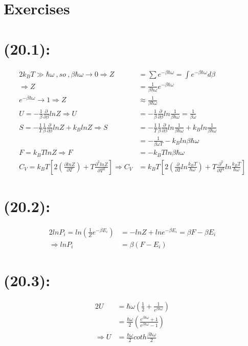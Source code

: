 \begin{latin}
    \section*{Exercises}
    \section*{(20.1):}
    \begin{alignat*}{2}
        k_B T \gg \hbar \omega \ ,so\ ,\beta \hbar \omega\to 0\Longrightarrow Z &= \sum e^{-\beta \hbar \omega} = \int e^{-\beta \hbar \omega} d\beta\\
        \Longrightarrow Z &= \frac{1}{\beta \hbar \omega} e^{-\beta \hbar \omega} \\
        e^{-\beta \hbar \omega} \to 1 \Longrightarrow Z &\approx \frac{1}{\beta \hbar \omega}\\
        U = -\frac{1}{\beta}\frac{\partial}{\partial \beta}ln Z \Rightarrow U&= -\frac{1}{\beta}\frac{\partial}{\partial \beta}ln \frac{1}{\beta \hbar \omega} = \frac{1}{\beta \omega}\\
        S = -\frac{1}{T}\frac{1}{\beta}\frac{\partial}{\partial \beta}lnZ + k_B lnZ \Rightarrow S &= -\frac{1}{T}\frac{1}{\beta}\frac{\partial}{\partial \beta}ln\frac{1}{\beta \hbar \omega} + k_B ln\frac{1}{\beta \hbar \omega}\\
        &= -\frac{1}{\beta \omega T} - k_B ln \beta \hbar \omega\\
        F = k_B TlnZ \Rightarrow F&= -k_B T ln \beta \hbar \omega\\
        C_V = k_B T [2(\frac{\partial lnZ}{\partial T})+ T\frac{\partial^2lnZ}{\partial T^2}]
        \Rightarrow  C_V &= k_B T [2(\frac{\partial  }{\partial T}ln\frac{k_B T}{\hbar \omega})+ T\frac{\partial^2}{\partial T^2}ln\frac{k_B T}{\hbar \omega}]
    \end{alignat*}
    \section*{(20.2):}
    \begin{alignat*}{2}
        lnP_i = ln(\frac{1}{Z}e^{-\beta E_i}) &= -lnZ + ln e^{-\beta E_i} = \beta F  - \beta E_i\\
        \Longrightarrow  lnP_i &= \beta (F-E_i)
    \end{alignat*}
    \section*{(20.3):}
    \begin{alignat*}{2}
        U &= \hbar \omega (\frac{1}{2}+ \frac{1}{e^{\beta \hbar \omega}})\\
        &=\frac{\hbar \omega}{2}(\frac{e^{\beta \hbar \omega }+1}{e^{\beta \hbar \omega }- 1} )\\
        \Longrightarrow U &= \frac{\hbar \omega}{2} coth\frac{{\beta \hbar \omega}}{2}
    \end{alignat*}

\end{latin}

